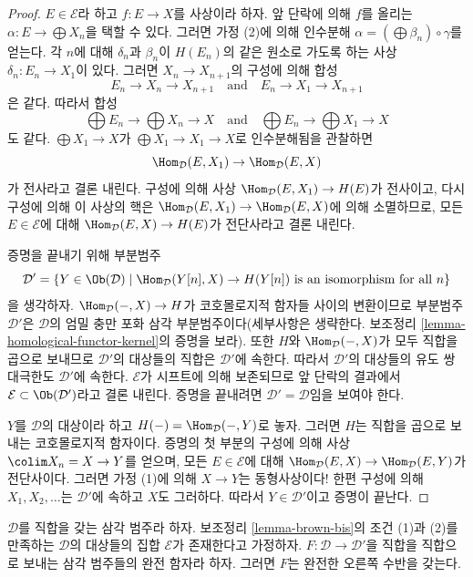 \begin{proof}
\medskip\noindent
$E \in \mathcal{E}$라 하고 $f : E \to X$를 사상이라 하자. 앞 단락에
의해 $f$를 올리는 $\alpha : E \to \bigoplus X_n$을 택할 수 있다.
그러면 가정 (2)에 의해 인수분해
$\alpha = (\bigoplus \beta_n) \circ \gamma$를 얻는다. 각 $n$에 대해
$\delta_n$과 $\beta_n$이 $H(E_n)$의 같은 원소로 가도록 하는 사상
$\delta_n : E_n \to X_1$이 있다. 그러면 $X_n \to X_{n + 1}$의
구성에 의해 합성
$$
E_n \to X_n \to X_{n + 1}
\quad\text{and}\quad
E_n \to X_1 \to X_{n + 1}
$$
은 같다. 따라서 합성
$$
\bigoplus E_n \to \bigoplus X_n \to X
\quad\text{and}\quad
\bigoplus E_n \to \bigoplus X_1 \to X
$$
도 같다. $\bigoplus X_1 \to X$가
$\bigoplus X_1 \to X_1 \to X$로 인수분해됨을 관찰하면
$$
\Hom_\mathcal{D}(E, X_1) \to \Hom_\mathcal{D}(E, X)
$$
가 전사라고 결론 내린다. 구성에 의해 사상
$\Hom_\mathcal{D}(E, X_1) \to H(E)$가 전사이고, 다시 구성에 의해
이 사상의 핵은 $\Hom_\mathcal{D}(E, X_1) \to \Hom_\mathcal{D}(E, X)$에
의해 소멸하므로, 모든 $E \in \mathcal{E}$에 대해
$\Hom_\mathcal{D}(E, X) \to H(E)$가 전단사라고 결론 내린다.

\medskip\noindent
증명을 끝내기 위해 부분범주
$$
\mathcal{D}' =
\{Y \in \Ob(\mathcal{D}) \mid \Hom_\mathcal{D}(Y[n], X) \to H(Y[n])
\text{ is an isomorphism for all }n\}
$$
을 생각하자. $\Hom_\mathcal{D}(-, X) \to H$가 코호몰로지적 함자들
사이의 변환이므로 부분범주 $\mathcal{D}'$은 $\mathcal{D}$의 엄밀 충만
포화 삼각 부분범주이다(세부사항은 생략한다. 보조정리
\ref{lemma-homological-functor-kernel}의 증명을 보라). 또한 $H$와
$\Hom_\mathcal{D}(-, X)$가 모두 직합을 곱으로 보내므로
$\mathcal{D}'$의 대상들의 직합은 $\mathcal{D}'$에 속한다. 따라서
$\mathcal{D}'$의 대상들의 유도 쌍대극한도 $\mathcal{D}'$에 속한다.
$\mathcal{E}$가 시프트에 의해 보존되므로 앞 단락의 결과에서
$\mathcal{E} \subset \Ob(\mathcal{D}')$라고 결론 내린다. 증명을
끝내려면 $\mathcal{D}' = \mathcal{D}$임을 보여야 한다.

\medskip\noindent
$Y$를 $\mathcal{D}$의 대상이라 하고
$H(-) = \Hom_\mathcal{D}(-, Y)$로 놓자. 그러면 $H$는 직합을 곱으로
보내는 코호몰로지적 함자이다. 증명의 첫 부분의 구성에 의해 사상
$\colim X_n = X \to Y$를 얻으며, 모든 $E \in \mathcal{E}$에 대해
$\Hom_\mathcal{D}(E, X) \to \Hom_\mathcal{D}(E, Y)$가 전단사이다.
그러면 가정 (1)에 의해 $X \to Y$는 동형사상이다! 한편 구성에 의해
$X_1, X_2, \ldots$는 $\mathcal{D}'$에 속하고 $X$도 그러하다.
따라서 $Y \in \mathcal{D}'$이고 증명이 끝난다.
\end{proof}

\begin{proposition}
\label{proposition-brown-bis}
$\mathcal{D}$를 직합을 갖는 삼각 범주라 하자. 보조정리
\ref{lemma-brown-bis}의 조건 (1)과 (2)를 만족하는 $\mathcal{D}$의
대상들의 집합 $\mathcal{E}$가 존재한다고 가정하자.
$F : \mathcal{D} \to \mathcal{D}'$을 직합을 직합으로 보내는 삼각
범주들의 완전 함자라 하자. 그러면 $F$는 완전한 오른쪽 수반을 갖는다.
\end{proposition}

